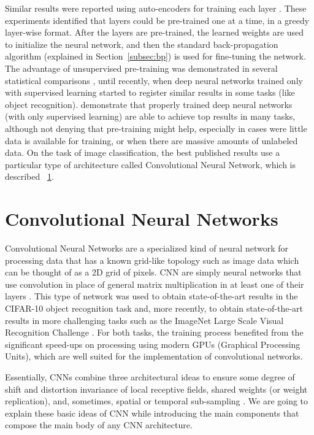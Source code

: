 \indent Similar results were reported using auto-encoders for training each layer \cite{bengio2007greedy}. These experiments identified that layers could be pre-trained one at a time, in a greedy layer-wise format. After the layers are pre-trained, the learned weights are used to initialize the neural network, and then the standard back-propagation algorithm (explained in Section~\ref{subsec:bp}) is used for fine-tuning the network. The advantage of unsupervised pre-training was demonstrated in several statistical comparisons \cite{bengio2007greedy,larochelle2007empirical,erhan2009difficulty}, until recently, when deep neural networks trained only with supervised learning started to register similar results in some tasks (like object recognition). \citealt{ciresan2012multi} demonstrate that properly trained deep neural networks (with only supervised learning) are able to achieve top results in many tasks, although not denying that pre-training might help, especially in cases were little data is available for training, or when there are massive amounts of unlabeled data. On the task of image classification, the best published results use a particular type of architecture called Convolutional Neural Network, which is described ~\ref{sec:cnn}.



\section{Convolutional Neural Networks}
\label{sec:cnn}
Convolutional Neural Networks are a specialized kind of neural network for processing data that has a known grid-like topology such as image data which can be thought of as a 2D grid of pixels. CNN are simply neural networks that use convolution in place of general matrix multiplication in at least one of their layers \cite{Goodfellow-et-al-2016-Book}. This type of network was used to obtain state-of-the-art results in the CIFAR-10 object recognition task \cite{ciresan2012multi} and, more recently, to obtain state-of-the-art results in more challenging tasks such as the ImageNet Large Scale Visual Recognition Challenge \cite{russakovsky2015imagenet}. For both tasks, the training process benefited from the significant speed-ups on processing using modern GPUs (Graphical Processing Units), which are well suited for the implementation of convolutional networks.


Essentially, CNNs combine three architectural ideas to ensure some degree of shift and distortion invariance of local receptive fields, shared weights (or weight replication), and, sometimes, spatial or temporal sub-sampling \cite{lecun2010convolutional}. We are going to explain these basic ideas of CNN while introducing the main components that compose the main body of any CNN architecture.

